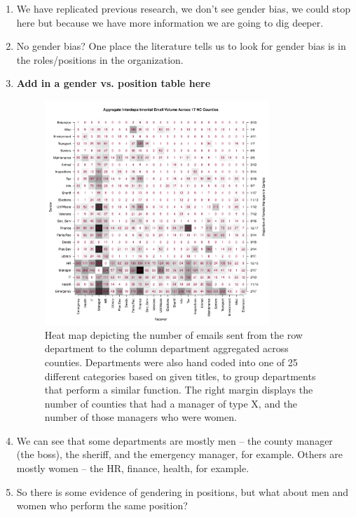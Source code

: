\documentclass[fleqn]{MJDArticle}
\begin{document}
\begin{enumerate}
	\item We have replicated previous research, we don't see gender bias, we could stop here but because we have more information we are going to dig deeper.
	
	\item No gender bias? One place the literature tells us to look for gender bias is in the roles/positions in the organization.
	
	\item \textbf{Add in a gender vs. position table here}
	
	\begin{figure}[H]
	\centering
	\includegraphics[width = 0.8\textwidth]{images/Aggregate_Email_Flows.pdf}
	\caption{\label{fig:heatmaps}Heat map depicting the number of emails sent from the row department to the column department aggregated across counties. Departments were also hand coded into one of 25 different categories based on given titles, to group departments that perform a similar function. The right margin displays the number of counties that had a manager of type X, and the number of those managers who were women.}
	\end{figure}
	
	\item We can see that some departments are mostly men -- the county manager (the boss), the sheriff, and the emergency manager, for example. Others are mostly women -- the HR, finance, health, for example. 
	\item So there is some evidence of gendering in positions, but what about men and women who perform the same position? 
	

\end{enumerate}
\end{document}
